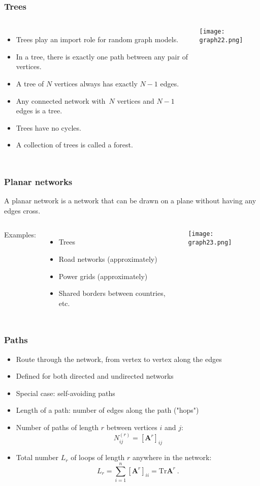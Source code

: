 \documentclass[10pt,aspectratio=169,dvipsnames]{beamer}
\let\olditem\item
\renewcommand{\item}{%
\olditem\vspace{5pt}}
\begin{document}
\begin{frame}
\frametitle{Trees}
\begin{columns}
\begin{itemize}
\item Trees play an import role for random graph models.
\item In a tree, there is exactly one path between any pair of vertices.
\item A tree of $N$ vertices always has exactly $N-1$ edges.
\item Any connected network with~$N$ vertices and $N-1$ edges is a tree.
  \item Trees have \alert{no cycles}.
\item A collection of trees is called a \alert{forest}.
\end{itemize}
\texttt{[image: graph22.png]}
\end{columns}
\end{frame}
\begin{frame}
\frametitle{Planar networks}
A \alert{planar network} is a network that can be drawn on a plane without having any edges cross.\\
\vspace{0.5cm}
\begin{columns}
Examples:
\begin{itemize}
\item Trees
\item Road networks (approximately)
\item Power grids (approximately)
\item Shared borders between countries, etc.
\end{itemize}
\texttt{[image: graph23.png]}
\end{columns}
\end{frame}
\begin{frame}
\frametitle{Paths}
\begin{itemize}
\item Route through the network, from vertex to vertex along the edges
\item Defined for both directed and undirected networks
\item Special case: self-avoiding paths
\item \alert{Length} of a path: number of edges along the path ("hops")
\item Number of paths of length $r$ between vertices $i$ and $j$:
\begin{equation*}
N_{ij}^{(r)}=\left[\mathbf{A}^{r}\right]_{ij}
\end{equation*}
\item Total number $L_{r}$ of loops of length $r$ anywhere in the network:
\begin{equation*}
L_{r}=\sum_{i=1}^{n}\left[\mathbf{A}^{r}\right]_{ii}=\text{Tr}\mathbf{A}^{r}~.
\end{equation*}
\end{itemize}
\end{frame}
\end{document}
